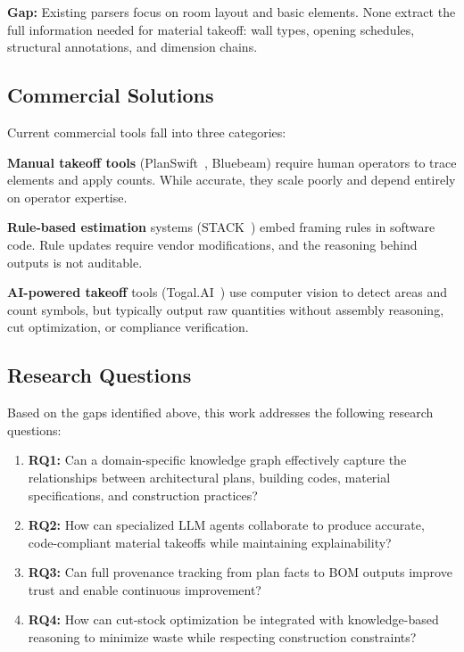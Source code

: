 \textbf{Gap:} Existing parsers focus on room layout and basic elements. None extract the full information needed for material takeoff: wall types, opening schedules, structural annotations, and dimension chains.

\subsection{Commercial Solutions}

Current commercial tools fall into three categories:

\textbf{Manual takeoff tools} (PlanSwift~\cite{planswift2024}, Bluebeam) require human operators to trace elements and apply counts. While accurate, they scale poorly and depend entirely on operator expertise.

\textbf{Rule-based estimation} systems (STACK~\cite{stack2024}) embed framing rules in software code. Rule updates require vendor modifications, and the reasoning behind outputs is not auditable.

\textbf{AI-powered takeoff} tools (Togal.AI~\cite{togalai2024}) use computer vision to detect areas and count symbols, but typically output raw quantities without assembly reasoning, cut optimization, or compliance verification.

\subsection{Research Questions}

Based on the gaps identified above, this work addresses the following research questions:

\begin{enumerate}
  \item \textbf{RQ1:} Can a domain-specific knowledge graph effectively capture the relationships between architectural plans, building codes, material specifications, and construction practices?
  \item \textbf{RQ2:} How can specialized LLM agents collaborate to produce accurate, code-compliant material takeoffs while maintaining explainability?
  \item \textbf{RQ3:} Can full provenance tracking from plan facts to BOM outputs improve trust and enable continuous improvement?
  \item \textbf{RQ4:} How can cut-stock optimization be integrated with knowledge-based reasoning to minimize waste while respecting construction constraints?
\end{enumerate}

